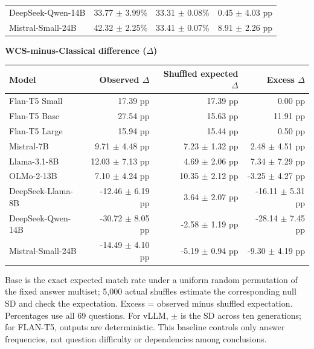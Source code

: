 \begin{table}[htbp]
\begin{tabular}{lrrr}
DeepSeek-Qwen-14B & 33.77 $\pm$ 3.99\% & 33.31 $\pm$ 0.08\% & 0.45 $\pm$ 4.03 pp \\
Mistral-Small-24B & 42.32 $\pm$ 2.25\% & 33.41 $\pm$ 0.07\% & 8.91 $\pm$ 2.26 pp \\
\bottomrule
\end{tabular}
\vspace{4pt}
\textbf{WCS-minus-Classical difference ($\Delta$)}
\begin{tabular}{lrrr}
\toprule
Model & Observed $\Delta$ & Shuffled expected $\Delta$ & Excess $\Delta$ \\
\midrule
Flan-T5 Small & 17.39 pp & 17.39 pp & 0.00 pp \\
Flan-T5 Base & 27.54 pp & 15.63 pp & 11.91 pp \\
Flan-T5 Large & 15.94 pp & 15.44 pp & 0.50 pp \\
Mistral-7B & 9.71 $\pm$ 4.48 pp & 7.23 $\pm$ 1.32 pp & 2.48 $\pm$ 4.51 pp \\
Llama-3.1-8B & 12.03 $\pm$ 7.13 pp & 4.69 $\pm$ 2.06 pp & 7.34 $\pm$ 7.29 pp \\
OLMo-2-13B & 7.10 $\pm$ 4.24 pp & 10.35 $\pm$ 2.12 pp & -3.25 $\pm$ 4.27 pp \\
DeepSeek-Llama-8B & -12.46 $\pm$ 6.19 pp & 3.64 $\pm$ 2.07 pp & -16.11 $\pm$ 5.31 pp \\
DeepSeek-Qwen-14B & -30.72 $\pm$ 8.05 pp & -2.58 $\pm$ 1.19 pp & -28.14 $\pm$ 7.45 pp \\
Mistral-Small-24B & -14.49 $\pm$ 4.10 pp & -5.19 $\pm$ 0.94 pp & -9.30 $\pm$ 4.19 pp \\
\bottomrule
\end{tabular}
\vspace{2pt}
\begin{minipage}{\linewidth}
\scriptsize Base is the exact expected match rate under a uniform random permutation of the fixed answer multiset; 5,000 actual shuffles estimate the corresponding null SD and check the expectation. Excess = observed minus shuffled expectation. Percentages use all 69 questions. For vLLM, $\pm$ is the SD across ten generations; for FLAN-T5, outputs are deterministic. This baseline controls only answer frequencies, not question difficulty or dependencies among conclusions.
\end{minipage}
\end{table}
